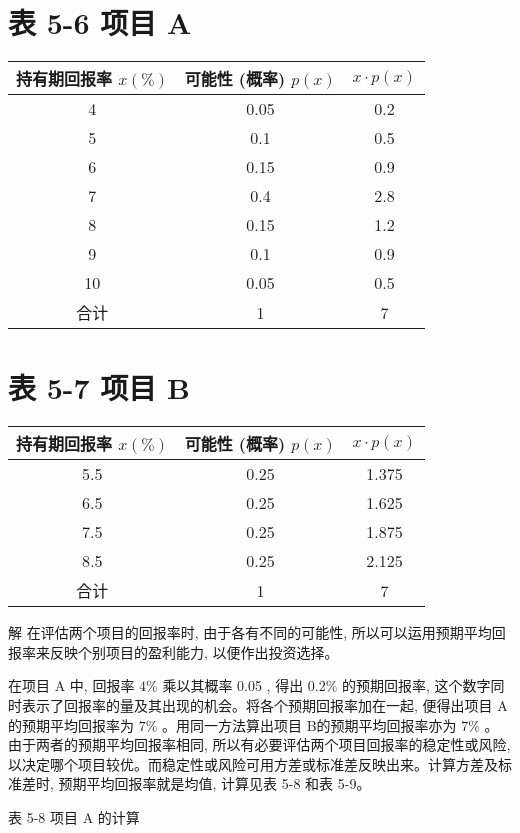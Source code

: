 \documentclass[10pt]{article}
\begin{document}
\begin{CJK*}{UTF8}{bsmi}
\section*{表 5-6 项目 A}
\begin{center}
\begin{tabular}{ccc}
\hline
持有期回报率 $x(\%)$ & 可能性 (概率) $p(x)$ & $x \cdot p(x)$ \\
\hline
4 & 0.05 & 0.2 \\
5 & 0.1 & 0.5 \\
6 & 0.15 & 0.9 \\
7 & 0.4 & 2.8 \\
8 & 0.15 & 1.2 \\
9 & 0.1 & 0.9 \\
10 & 0.05 & 0.5 \\
\hline
合计 & 1 & 7 \\
\hline
\end{tabular}
\end{center}

\section*{表 5-7 项目 B}
\begin{center}
\begin{tabular}{ccc}
\hline
持有期回报率 $x(\%)$ & 可能性 (概率) $p(x)$ & $x \cdot p(x)$ \\
\hline
5.5 & 0.25 & 1.375 \\
6.5 & 0.25 & 1.625 \\
7.5 & 0.25 & 1.875 \\
8.5 & 0.25 & 2.125 \\
\hline
合计 & 1 & 7 \\
\hline
\end{tabular}
\end{center}

解 在评估两个项目的回报率时, 由于各有不同的可能性, 所以可以运用预期平均回报率来反映个别项目的盈利能力, 以便作出投资选择。

在项目 A 中, 回报率 $4 \%$ 乘以其概率 0.05 , 得出 $0.2 \%$ 的预期回报率, 这个数字同时表示了回报率的量及其出现的机会。将各个预期回报率加在一起, 便得出项目 $\mathrm{A}$ 的预期平均回报率为 $7 \%$ 。用同一方法算出项目 B的预期平均回报率亦为 $7 \%$ 。由于两者的预期平均回报率相同, 所以有必要评估两个项目回报率的稳定性或风险, 以决定哪个项目较优。而稳定性或风险可用方差或标准差反映出来。计算方差及标准差时, 预期平均回报率就是均值, 计算见表 5-8 和表 5-9。

表 5-8 项目 $\mathrm{A}$ 的计算


\end{CJK*}
\end{document}
